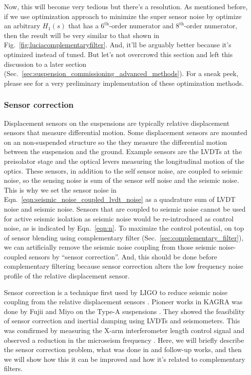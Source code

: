 Now, this will become very tedious but there's a resolution.
As mentioned before, if we use optimization approach to minimize the super sensor noise by optimize an arbitrary $H_1(s)$ that has a $6^\mathrm{th}$-order numerator and $8^\mathrm{th}$-order numerator, then the result will be very similar to that shown in Fig.~\ref{fig:luciacomplementaryfilter}.
And, it'll be arguably better because it's optimized instead of tuned.
But let's not overcrowd this section and left this discussion to a later section (Sec.~\ref{sec:suspension_commissioning_advanced_methods}).
For a sneak peek, please see \cite{srm_inertial_damping, discussion_on_vis_inertial_sensor} for a very preliminary implementation of these optimization methods.

\subsubsection{Sensor correction \label{sec:sensor_correction}}
Displacement sensors on the suspensions are typically relative displacement sensors that measure differential motion.
Some displacement sensors are mounted on an non-suspended structure so the they measure the differential motion between the suspension and the ground.
Example sensors are the LVDTs at the preisolator stage and the optical levers measuring the longitudinal motion of the optics.
These sensors, in addition to the self sensor noise, are coupled to seismic noise, so the sensing noise is sum of the sensor self noise and the seismic noise.
This is why we set the sensor noise in Eqn.~\eqref{eqn:seismic_noise_coupled_lvdt_noise} as a quadrature sum of LVDT noise and seismic noise.
Sensors that are coupled to seismic noise cannot be used for active seismic isolation as seismic noise would be re-introduced as control noise, as is indicated by Eqn.~\eqref{eqn:n}.
To maximize the control potential, on top of sensor blending using complementary filter (Sec.~\eqref{sec:complementary_filter}), we can artificially remove the seismic noise coupling from those seismic noise-coupled sensors by ``sensor correction''.
And, this should be done before complementary filtering because sensor correction alters the low frequency noise profile of the relative displacement sensor.

Sensor correction is a technique first used by LIGO to reduce seismic noise coupling from the relative displacement sensors \cite{Matichard_2015}.
Pioneer works in KAGRA was done by Fujii and Miyo on the Type-A suspensions \cite{a_sensor_correction_test_with_ip}.
They showed the feasibility of sensor correction and inertial damping using LVDTs and seismometers.
This was comfirmed by measuring the X-arm interferometer length control signal and observed a reduction in the microseism frequency \cite{sensor_correction_performance_check_part1, performance_check_of_sensor_correction_with_xarm_part2}.
Here, we will briefly describe the sensor correction problem, what was done in \cite{Matichard_2015, a_sensor_correction_test_with_ip} and follow-up works, and then we will show how this it can be improved and how it's related to complementary filters.

